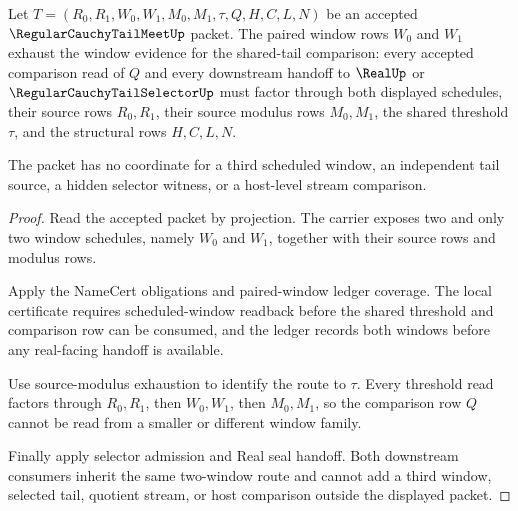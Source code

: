 \begin{theorem}
\label{thm:regular-cauchy-tail-meet-window-pair-exhaustion}
Let $T=(R_0,R_1,W_0,W_1,M_0,M_1,\tau,Q,H,C,L,N)$ be an accepted $\RegularCauchyTailMeetUp$ packet. The paired window rows $W_0$ and $W_1$ exhaust the window evidence for the shared-tail comparison: every accepted comparison read of $Q$ and every downstream handoff to $\RealUp$ or $\RegularCauchyTailSelectorUp$ must factor through both displayed schedules, their source rows $R_0,R_1$, their source modulus rows $M_0,M_1$, the shared threshold $\tau$, and the structural rows $H,C,L,N$.

The packet has no coordinate for a third scheduled window, an independent tail source, a hidden selector witness, or a host-level stream comparison.
\end{theorem}
\begin{proof}
Read the accepted packet by projection. The carrier exposes two and only two window schedules, namely $W_0$ and $W_1$, together with their source rows and modulus rows.

Apply the NameCert obligations and paired-window ledger coverage. The local certificate requires scheduled-window readback before the shared threshold and comparison row can be consumed, and the ledger records both windows before any real-facing handoff is available.

Use source-modulus exhaustion to identify the route to $\tau$. Every threshold read factors through $R_0,R_1$, then $W_0,W_1$, then $M_0,M_1$, so the comparison row $Q$ cannot be read from a smaller or different window family.

Finally apply selector admission and Real seal handoff. Both downstream consumers inherit the same two-window route and cannot add a third window, selected tail, quotient stream, or host comparison outside the displayed packet.
\end{proof}

